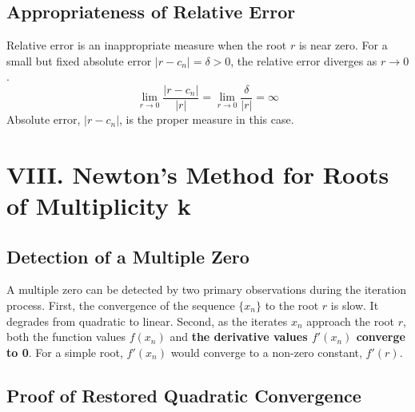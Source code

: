 \documentclass[a4paper]{article}
\begin{document}
\subsection*{Appropriateness of Relative Error}

Relative error is an inappropriate measure when the root $r$ is near zero.
For a small but fixed absolute error $|r-c_n| = \delta > 0$, the relative error diverges as $r \to 0$.
\[
\lim_{r \to 0} \frac{|r-c_n|}{|r|} = \lim_{r \to 0} \frac{\delta}{|r|} = \infty
\]
Absolute error, $|r-c_n|$, is the proper measure in this case.


\section*{VIII. Newton's Method for Roots of Multiplicity k}

\subsection*{Detection of a Multiple Zero}

A multiple zero can be detected by two primary observations during the iteration process.
First, the convergence of the sequence $\{x_n\}$ to the root $r$ is slow. It degrades from quadratic to linear.
Second, as the iterates $x_n$ approach the root $r$, both the function values $f(x_n)$ and \textbf{the derivative values $f'(x_n)$ converge to 0}.
For a simple root, $f'(x_n)$ would converge to a non-zero constant, $f'(r)$.

\subsection*{Proof of Restored Quadratic Convergence}
\end{document}

